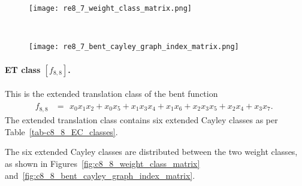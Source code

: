 \documentclass[12pt,a4paper]{article}
\begin{document}
\begin{figure}[!bhpt] %
\centering
\begin{minipage}{.48\textwidth}
  \centering
  \texttt{[image: re8\_7\_weight\_class\_matrix.png]}
  \label{fig:c8_7_weight_class_matrix}
\end{minipage}%
~~~~
\begin{minipage}{.48\textwidth}
  \centering
  \texttt{[image: re8\_7\_bent\_cayley\_graph\_index\_matrix.png]}
  \label{fig:c8_7_bent_cayley_graph_index_matrix}
\end{minipage}
\end{figure}

\paragraph*{ET class $[f_{8,8}]$.}
%
This is the extended translation class of the bent function
\small{}
\begin{align*}
f_{ 8 , 8 } &=
\begin{array}{l}
x_{0} x_{1} x_{2} + x_{0} x_{5} + x_{1} x_{3} x_{4} + x_{1} x_{6} + x_{2} x_{3} x_{5} + x_{2} x_{4}
+ x_{3} x_{7}.
\end{array}
\end{align*}
\normalsize{}
The extended translation class contains six extended Cayley classes as per Table~\ref{tab-c8_8_EC_classes}.

The six extended Cayley classes are distributed between the two weight classes,
as shown in Figures~\ref{fig:c8_8_weight_class_matrix} and~\ref{fig:c8_8_bent_cayley_graph_index_matrix}.
\end{document}

